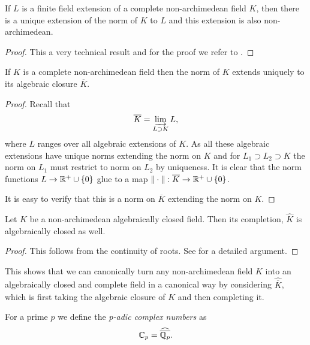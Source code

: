 \begin{theorem}\label{thm:norm_finite_field_ext}
	If $L$ is a finite field extension of a complete non-archimedean field $K$, then there is a unique extension of the norm of $K$ to $L$ and this extension is also non-archimedean.
\end{theorem}
\begin{proof}
	This a very technical result and for the proof we refer to \cite[][appendix A]{boschLecturesFormalRigid2014}. 
\end{proof}
\begin{corollary}
	If $K$ is a complete non-archimedean field then the norm of  $K$ extends uniquely to its algebraic closure $\overline{K}$.
\end{corollary}
\begin{proof}
	Recall that \[
	\overline{K} = \varinjlim_{L \supset K} L
	,\] 
	where $L$ ranges over all algebraic extensions of $K$. 
	As all these algebraic extensions have unique norms extending  the norm on $K$ and for $L_1 \supset L_2 \supset K$ the norm on  $L_1$ must restrict to norm on $L_2$ by uniqueness. 
	It is clear that the norm functions $L \to \mathbb{R}^{+} \cup \{0\} $ glue to a map $\|\cdot \|: \overline{K} \to \mathbb{R}^{+} \cup \{0\} $. 

	It is easy to verify that this is a norm on $\overline{K}$ extending the norm on $K$. 
\end{proof}

\begin{theorem}
	Let $K$ be a non-archimedean algebraically closed field. 
	Then its completion, $\widehat K$ is algebraically closed as well. 
\end{theorem}
\begin{proof}
	This follows from the continuity of roots. See \cite[][lem A.6]{boschLecturesFormalRigid2014} for a detailed argument. 
\end{proof}

This shows that we can canonically turn any non-archimedean field $K$ into an algebraically closed and complete field in a canonical way by considering $\widehat{\overline{K}}$, which is first taking the algebraic closure of $K$ and then completing it. 

\begin{definition}
	For a prime $p$ we define the \emph{p-adic complex numbers} as \[
	\mathbb{C}_p = \widehat{\overline{\mathbb{Q}_p}}
	.\] 
\end{definition}


